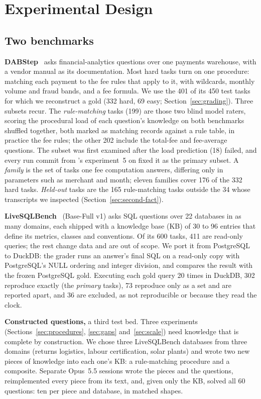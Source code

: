 \section{Experimental Design}
\label{sec:design}

\subsection{Two benchmarks}
\label{sec:benchmarks}

\textbf{DABStep}~\cite{dabstep} asks financial-analytics questions over one
payments warehouse, with a vendor manual as its documentation. Most hard
tasks turn on one procedure: matching each payment to the fee rules that
apply to it, with wildcards, monthly volume and fraud bands, and a fee
formula. We use the 401 of its 450 test tasks for which we reconstruct a
gold (332 hard, 69 easy; Section~\ref{sec:grading}). Three subsets recur.
The \emph{rule-matching} tasks (199) are those two blind model raters,
scoring the procedural load of each question's knowledge on both
benchmarks shuffled together, both marked as matching records against a
rule table, in practice the fee rules; the other 202 include the
total-fee and fee-average questions. The subset was first examined after
the load prediction (18) failed, and every run commit from \mQwen{}'s
experiment~5 on fixed it as the primary subset. A \emph{family} is the set of
tasks one fee computation answers, differing only in parameters such as
merchant and month; eleven families cover 176 of the 332 hard tasks.
\emph{Held-out} tasks are the 165 rule-matching tasks outside the 34 whose
transcripts we inspected (Section~\ref{sec:second-fact}).

\textbf{LiveSQLBench}~\cite{livesqlbench} (Base-Full v1) asks SQL
questions over 22 databases in as many domains, each shipped with a
knowledge base (KB) of 30 to 96 entries that define its metrics, classes
and conventions. Of its 600 tasks, 411 are read-only queries; the rest
change data and are out of scope. We port it from PostgreSQL to DuckDB:
the grader runs an answer's final SQL on a read-only copy with
PostgreSQL's NULL ordering and integer division, and compares the result
with the frozen PostgreSQL gold. Executing each gold query 20 times in
DuckDB, 302 reproduce exactly (the \emph{primary} tasks), 73 reproduce only as a set
and are reported apart, and 36 are excluded, as not reproducible or
because they read the clock.

\textbf{Constructed questions,} a third test bed. Three experiments
(Sections~\ref{sec:procedures}, \ref{sec:gaps} and~\ref{sec:scale}) need
knowledge that is complete by construction. We chose three LiveSQLBench databases from
three domains (returns logistics, labour certification, solar plants) and
wrote two new pieces of knowledge into each one's KB: a rule-matching
procedure and a composite. Separate Opus~5.5 sessions wrote the pieces
and the questions, reimplemented every piece from its text, and, given
only the KB, solved all 60 questions: ten per piece and database, in
matched shapes.

